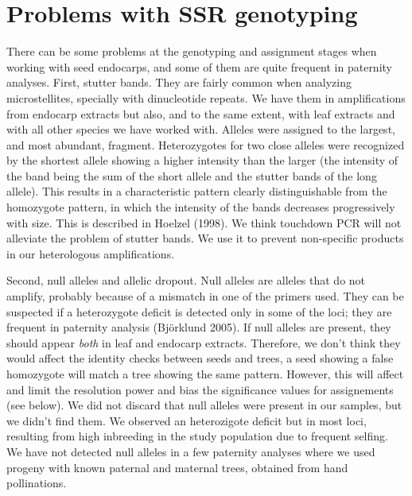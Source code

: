 \documentclass[a4paper,12pt]{article}
\newcommand{\tab}{\hspace{5mm}}
\begin{document}
\section{Problems with SSR genotyping}

\tab There can be some problems at the genotyping and assignment stages when working with seed endocarps, and some of them are quite frequent in paternity analyses. First, stutter bands. They are fairly common when analyzing microstellites, specially with dinucleotide repeats. We have them in amplifications from endocarp extracts but also, and to the same extent, with leaf extracts and with all other species we have worked with. Alleles were assigned to the largest, and most abundant, fragment. Heterozygotes for two close alleles were recognized by the shortest allele showing a higher intensity than the larger (the intensity of the band being the sum of the short allele and the stutter bands of the long allele). This results in a characteristic pattern clearly distinguishable from the homozygote pattern, in which the intensity of the bands decreases progressively with size. This is described in Hoelzel (1998). We think touchdown PCR will not alleviate the problem of stutter bands. We use it to prevent non-specific products in our heterologous amplifications.

\tab Second, null alleles and allelic dropout. Null alleles are alleles that do not amplify, probably because of a mismatch in one of the primers used. They can be suspected if a heterozygote deficit is detected only in some of the loci; they are frequent in paternity analysis (Bj\"{o}rklund 2005). If null alleles are present, they should appear \textit{both} in leaf and endocarp extracts. Therefore, we don't think they would affect the identity checks between seeds and trees, a seed showing a false homozygote will match a tree showing the same pattern. However, this will affect and limit the resolution power and bias the significance values for assignements (see below). We did not discard that null alleles were present in our samples, but we didn't find them. We observed an heterozigote deficit but in most loci, resulting from high inbreeding in the study population due to frequent selfing. We have not detected null alleles in a few paternity analyses where we used progeny with known paternal and maternal trees, obtained from hand pollinations.
\end{document}
